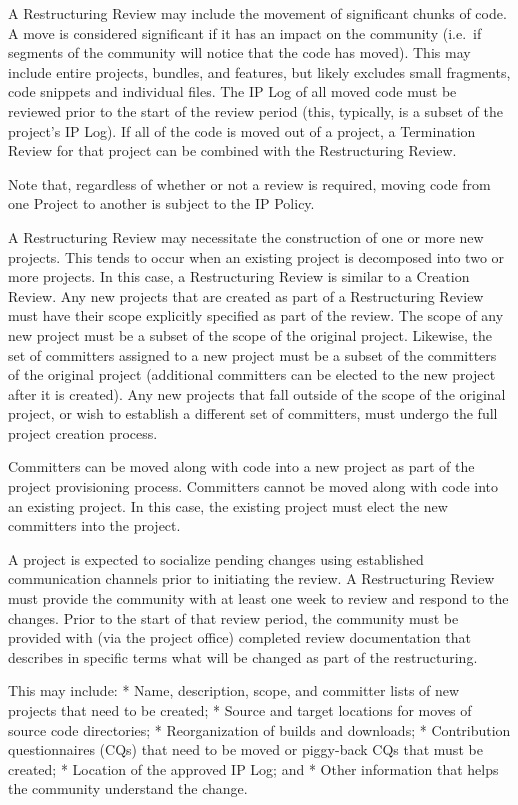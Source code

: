 A Restructuring Review may include the movement of significant chunks of
code. A move is considered significant if it has an impact on the
community (i.e.~if segments of the community will notice that the code
has moved). This may include entire projects, bundles, and features, but
likely excludes small fragments, code snippets and individual files. The
IP Log of all moved code must be reviewed prior to the start of the
review period (this, typically, is a subset of the project's IP Log). If
all of the code is moved out of a project, a Termination Review for that
project can be combined with the Restructuring Review.

Note that, regardless of whether or not a review is required, moving
code from one Project to another is subject to the IP Policy.

A Restructuring Review may necessitate the construction of one or more
new projects. This tends to occur when an existing project is decomposed
into two or more projects. In this case, a Restructuring Review is
similar to a Creation Review. Any new projects that are created as part
of a Restructuring Review must have their scope explicitly specified as
part of the review. The scope of any new project must be a subset of the
scope of the original project. Likewise, the set of committers assigned
to a new project must be a subset of the committers of the original
project (additional committers can be elected to the new project after
it is created). Any new projects that fall outside of the scope of the
original project, or wish to establish a different set of committers,
must undergo the full project creation process.

Committers can be moved along with code into a new project as part of
the project provisioning process. Committers cannot be moved along with
code into an existing project. In this case, the existing project must
elect the new committers into the project.

A project is expected to socialize pending changes using established
communication channels prior to initiating the review. A Restructuring
Review must provide the community with at least one week to review and
respond to the changes. Prior to the start of that review period, the
community must be provided with (via the project office) completed
review documentation that describes in specific terms what will be
changed as part of the restructuring.

This may include: * Name, description, scope, and committer lists of new
projects that need to be created; * Source and target locations for
moves of source code directories; * Reorganization of builds and
downloads; * Contribution questionnaires (CQs) that need to be moved or
piggy-back CQs that must be created; * Location of the approved IP Log;
and * Other information that helps the community understand the change.

